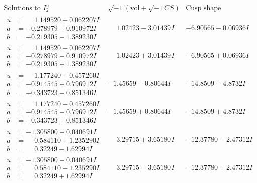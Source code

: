 \documentclass[1p]{elsarticle_modified}
\theoremstyle{definition}
\newcommand{\I}{\sqrt{-1}}
\begin{document}
$$\begin{array}{c|c|c}  
\text{Solutions to }I^u_{2}& \I (\text{vol} + \sqrt{-1}CS) & \text{Cusp shape}\\
 \hline 
\begin{aligned}
u &= \phantom{-}1.149520 + 0.062207 I \\
a &= -0.278979 + 0.910972 I \\
b &= -0.219305 - 1.389230 I\end{aligned}
 & \phantom{-}1.02423 - 3.01439 I & -6.90565 - 0.06936 I \\ \hline\begin{aligned}
u &= \phantom{-}1.149520 - 0.062207 I \\
a &= -0.278979 - 0.910972 I \\
b &= -0.219305 + 1.389230 I\end{aligned}
 & \phantom{-}1.02423 + 3.01439 I & -6.90565 + 0.06936 I \\ \hline\begin{aligned}
u &= \phantom{-}1.177240 + 0.457260 I \\
a &= -0.914545 + 0.796912 I \\
b &= -0.343723 - 0.851346 I\end{aligned}
 & -1.45659 - 0.80644 I & -14.8509 - 4.8732 I \\ \hline\begin{aligned}
u &= \phantom{-}1.177240 - 0.457260 I \\
a &= -0.914545 - 0.796912 I \\
b &= -0.343723 + 0.851346 I\end{aligned}
 & -1.45659 + 0.80644 I & -14.8509 + 4.8732 I \\ \hline\begin{aligned}
u &= -1.305800 + 0.040691 I \\
a &= \phantom{-}0.584110 + 1.235290 I \\
b &= \phantom{-}0.32249 - 1.62994 I\end{aligned}
 & \phantom{-}3.29715 + 3.65180 I & -12.37780 - 2.47312 I \\ \hline\begin{aligned}
u &= -1.305800 - 0.040691 I \\
a &= \phantom{-}0.584110 - 1.235290 I \\
b &= \phantom{-}0.32249 + 1.62994 I\end{aligned}
 & \phantom{-}3.29715 - 3.65180 I & -12.37780 + 2.47312 I \\ \hline\begin{aligned}

\end{aligned}
\end{array}$$
\end{document}

